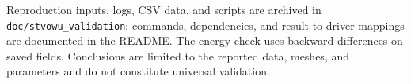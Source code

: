 \documentclass[10pt,a4paper]{article}
\begin{document}
Reproduction inputs, logs, CSV data, and scripts are archived in \texttt{doc/stvowu\_validation}; commands, dependencies, and result-to-driver mappings are documented in the README. The energy check uses backward differences on saved fields. Conclusions are limited to the reported data, meshes, and parameters and do not constitute universal validation.
\end{document}
